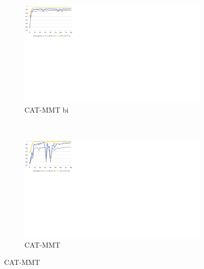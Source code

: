 
\begin{figure}[!htbp]
    \centering
    \begin{subfigure}[b]{0.5\textwidth}
      \includegraphics[width=\textwidth]{Img/fig_5_training_cat_mmt_bi.pdf}
      \caption{CAT-MMT bi}
      \label{fig:5_training_cat_mmt_bi}
    \end{subfigure}%
    ~%
    \begin{subfigure}[b]{0.5\textwidth}
      \includegraphics[width=\textwidth]{Img/fig_5_training_cat_mmt.pdf}
      \caption{CAT-MMT}
      \label{fig:5_training_cat_mmt}
    \end{subfigure}
    \label{fig:5_training}
\end{figure}